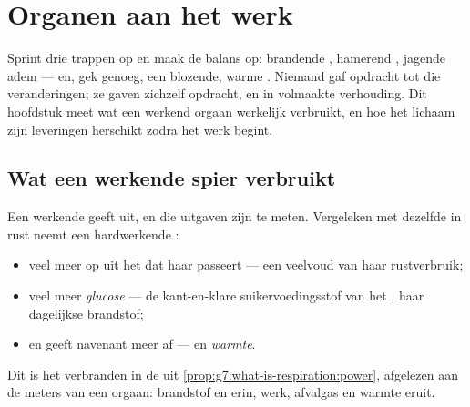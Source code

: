 \chapter{Organen aan het werk}\label{ch:g7:organs-at-work}

Sprint drie trappen op en maak de balans op: brandende , hamerend
, jagende adem --- en, gek genoeg, een blozende, warme . Niemand
gaf opdracht tot die veranderingen; ze gaven zichzelf opdracht, en in
volmaakte verhouding. Dit hoofdstuk meet wat een werkend orgaan werkelijk
verbruikt, en hoe het lichaam zijn leveringen herschikt zodra het werk
begint.

\section{Wat een werkende spier verbruikt}

\begin{proposition}\label{prop:g7:organs-at-work:bill}
Een werkende  geeft uit, en die uitgaven zijn te meten. Vergeleken
met dezelfde  in rust neemt een hardwerkende :
\begin{itemize}
  \item veel meer \emph{} op uit het  dat haar passeert ---
        een veelvoud van haar rustverbruik;
  \item veel meer \emph{glucose} --- de kant-en-klare
        suikervoedingsstof van het , haar dagelijkse brandstof;
  \item en geeft navenant meer \emph{} af --- en
        \emph{warmte}.
\end{itemize}
Dit is het verbranden in de  uit
\cref{prop:g7:what-is-respiration:power}, afgelezen aan de meters van een
orgaan: brandstof en  erin, werk, afvalgas en warmte eruit.
\end{proposition}
\admitted

